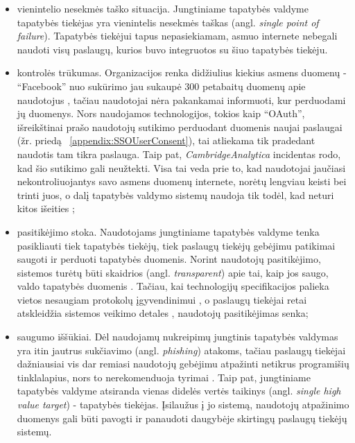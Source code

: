 \begin{itemize}
    \item vienintelio nesekmės taško situacija. Jungtiniame tapatybės valdyme tapatybės tiekėjas yra vienintelis nesekmės taškas (angl. \textit{single point of failure}).
    Tapatybės tiekėjui tapus nepasiekiamam, asmuo internete nebegali naudoti visų paslaugų, kurios buvo integruotos
    su šiuo tapatybės tiekėju.

    \item kontrolės trūkumas. Organizacijos renka didžiulius kiekius asmens duomenų - \enquote{Facebook} nuo sukūrimo
    jau sukaupė 300 petabaitų duomenų apie naudotojus \cite{Vagata2014}, tačiau naudotojai nėra pakankamai informuoti,
    kur perduodami jų duomenys. Nors naudojamos technologijos, tokios kaip \enquote{OAuth}, išreikštinai prašo naudotojų
    sutikimo perduodant duomenis naujai paslaugai (žr. priedą \hypertarget{appendix:SSOUserConsent}{~\ref{appendix:SSOUserConsent}}), tai atliekama tik pradedant naudotis tam tikra paslauga. Taip pat,
    \textit{CambridgeAnalytica} incidentas \cite{CambridgeAnalytica} rodo, kad šio sutikimo gali neužtekti.
    Visa tai veda prie to, kad naudotojai jaučiasi nekontroliuojantys savo asmens duomenų internete, norėtų lengviau keisti bei trinti juos, o
    dalį tapatybės valdymo sistemų naudoja tik todėl, kad neturi kitos išeities \cite{Baars2016};

    \item pasitikėjimo stoka. Naudotojams jungtiniame tapatybės valdyme tenka pasikliauti tiek tapatybės tiekėjų,
    tiek paslaugų tiekėjų gebėjimu patikimai saugoti ir perduoti tapatybės duomenis. Norint naudotojų pasitikėjimo,
    sistemos turėtų būti skaidrios (angl. \textit{transparent}) apie tai, kaip jos saugo, valdo tapatybės duomenis \cite{Baars2016}.
    Tačiau, kai technologijų specifikacijos palieka vietos nesaugiam protokolų įgyvendinimui \cite{OAuthSecurity},
    o paslaugų tiekėjai retai atskleidžia sistemos veikimo detales \cite{Baars2016}, naudotojų pasitikėjimas senka;

    \item saugumo iššūkiai. Dėl naudojamų nukreipimų jungtinis tapatybės valdymas yra itin jautrus sukčiavimo (angl. \textit{phishing}) atakoms,
    tačiau paslaugų tiekėjai dažniausiai vis dar remiasi naudotojų gebėjimu atpažinti netikrus programišių tinklalapius, nors to nerekomenduoja tyrimai \cite{Sun2011}.
    Taip pat, jungtiniame tapatybės valdyme atsiranda vienas didelės vertės taikinys (angl. \textit{single high value target}) - tapatybės tiekėjas. Įsilaužus į jo sistemą,
    naudotojų atpažinimo duomenys gali būti pavogti ir panaudoti daugybėje skirtingų paslaugų tiekėjų sistemų.

\end{itemize}

